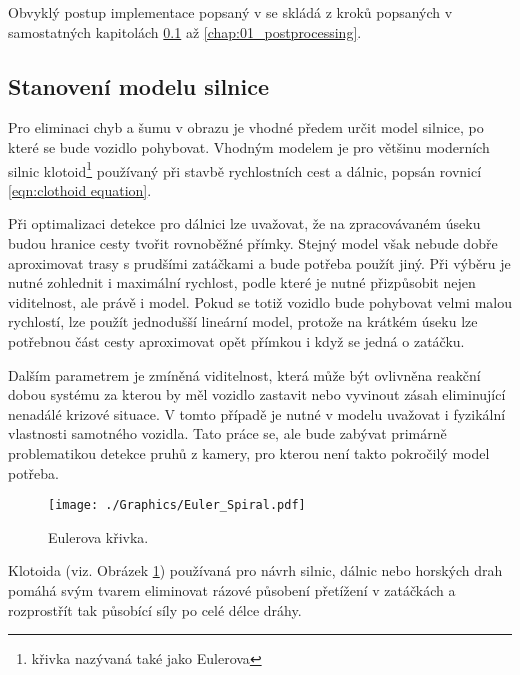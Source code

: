 \documentclass[czech, bc, kky, he, iso690numb]{fasthesis}
\begin{document}
            Obvyklý postup implementace popsaný v \cite{VIOLET} se skládá z kroků popsaných v samostatných kapitolách \ref{chap:01_stanoveni_modelu_silnice} až \ref{chap:01_postprocessing}.\\
            \subsection{Stanovení modelu silnice}\label{chap:01_stanoveni_modelu_silnice}
                Pro eliminaci chyb a šumu v obrazu je vhodné předem určit model silnice, po které se bude vozidlo pohybovat. Vhodným modelem je pro většinu moderních silnic klotoid\footnote{křivka nazývaná také jako Eulerova} používaný při stavbě rychlostních cest a dálnic, popsán rovnicí \ref{eqn:clothoid equation}.
                
                Při optimalizaci detekce pro dálnici lze uvažovat, že na zpracovávaném úseku budou hranice cesty tvořit rovnoběžné přímky. Stejný model však nebude dobře aproximovat trasy s prudšími zatáčkami a bude potřeba použít jiný. Při výběru je nutné zohlednit i maximální rychlost, podle které je nutné přizpůsobit nejen viditelnost, ale právě i model. Pokud se totiž vozidlo bude pohybovat velmi malou rychlostí, lze použít jednodušší lineární model, protože na krátkém úseku lze potřebnou část cesty aproximovat opět přímkou i když se jedná o zatáčku.
                
                Dalším parametrem je zmíněná viditelnost, která může být ovlivněna reakční dobou systému za kterou by měl vozidlo zastavit nebo vyvinout zásah eliminující nenadálé krizové situace. V tomto případě je nutné v modelu uvažovat i fyzikální vlastnosti samotného vozidla. Tato práce se, ale bude zabývat primárně problematikou detekce pruhů z kamery, pro kterou není takto pokročilý model potřeba.
                
                	\begin{figure}[h]
                		\centering
                		\texttt{[image: ./Graphics/Euler\_Spiral.pdf]}
                		\caption{Eulerova křivka.}
                		\label{pic:Eulerova_krivka}
                	\end{figure}
                
                Klotoida (viz. Obrázek \ref{pic:Eulerova_krivka}) používaná pro návrh silnic, dálnic nebo horských drah pomáhá svým tvarem eliminovat rázové působení přetížení v zatáčkách a rozprostřít tak působící síly po celé délce dráhy.
                
\end{document}
